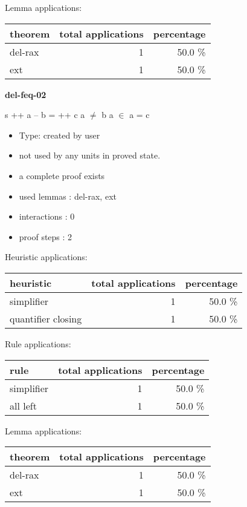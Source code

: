 \documentclass[a4paper]{article}
\begin{document}
Lemma applications:

\begin{supertabular}{l|r|r}
theorem	        & total applications & percentage \\ \hline
del-rax & 1 & 50.0 \% \\
ext & 1 & 50.0 \% \\

\end{supertabular}
\pagebreak

{\LARGE\bf del-feq-02}\label{lemma-del-feq-02}

\medskip

 \Fol s ++ a -- b =  ++ c \And a $\neq$ b \And \Not a $\in$  \Imp a = c

\begin{itemize}

\item Type: created by user

\item not used by any units in proved state.
\item       a complete proof exists
\item       used lemmas  : del-rax, ext
\item       interactions : 0
\item       proof steps  : 2
\end{itemize}

\medskip


Heuristic applications:

\begin{supertabular}{l|r|r}
heuristic	& total applications & percentage \\ \hline
simplifier & 1 & 50.0 \% \\
quantifier closing & 1 & 50.0 \% \\

\end{supertabular}

Rule applications:

\begin{supertabular}{l|r|r}
rule	        & total applications & percentage \\ \hline
simplifier & 1 & 50.0 \% \\
all left & 1 & 50.0 \% \\

\end{supertabular}

Lemma applications:

\begin{supertabular}{l|r|r}
theorem	        & total applications & percentage \\ \hline
del-rax & 1 & 50.0 \% \\
ext & 1 & 50.0 \% \\

\end{supertabular}
\pagebreak
\end{document}
